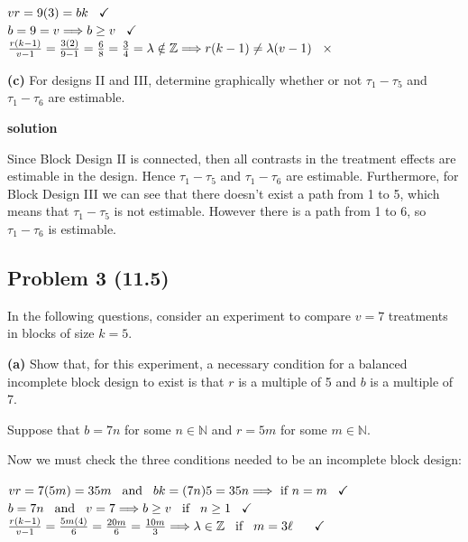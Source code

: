 \documentclass[12pt,]{article}
\begin{document}
\begin{center}
$vr = 9(3) = bk \hspace{.3cm}  \checkmark$\\
$b= 9 = v \Longrightarrow b \geq v \hspace{.3cm}  \checkmark$\\
$\frac{r(k-1)}{v-1} = \frac{3(2)}{9-1} = \frac{6}{8} = \frac{3}{4} = \lambda  \notin \mathbb{Z} \Longrightarrow r(k-1) \neq \lambda (v-1)  \hspace{.3cm} \times$
\end{center}

\textbf{(c)} For designs II and III, determine graphically whether or
not \(\tau_1 - \tau_5\) and \(\tau_1 - \tau_6\) are estimable.

\textbf{solution}

Since Block Design II is connected, then all contrasts in the treatment
effects are estimable in the design. Hence \(\tau_1 - \tau_5\) and
\(\tau_1 - \tau_6\) are estimable. Furthermore, for Block Design III we
can see that there doesn't exist a path from 1 to 5, which means that
\(\tau_1 - \tau_5\) is not estimable. However there is a path from 1 to
6, so \(\tau_1 - \tau_6\) is estimable.

\subsection{Problem 3 (11.5)}\label{problem-3-11.5}

In the following questions, consider an experiment to compare \(v = 7\)
treatments in blocks of size \(k = 5\).

\textbf{(a)} Show that, for this experiment, a necessary condition for a
balanced incomplete block design to exist is that \(r\) is a multiple of
5 and \(b\) is a multiple of 7.

Suppose that \(b= 7n\) for some \(n \in \mathbb{N}\) and \(r= 5m\) for
some \(m \in \mathbb{N}\).

Now we must check the three conditions needed to be an incomplete block
design:

\begin{center}
$vr = 7(5m) = 35m  \hspace{.3cm} \text{and} \hspace{.3cm} bk = (7n)5 = 35n \Longrightarrow \text{ if } n=m \hspace{.3cm}  \checkmark$\\
$b= 7n \hspace{.3cm} \text{and} \hspace{.3cm}  v=7 \Longrightarrow b \geq v \hspace{.3cm} \text{if} \hspace{.3cm} n \geq 1 \hspace{.3cm}  \checkmark$\\
$\frac{r(k-1)}{v-1} = \frac{5m(4)}{6} = \frac{20m}{6} = \frac{10m}{3}  
 \Longrightarrow  \lambda  \in \mathbb{Z} \hspace{.3cm} \text{if} \hspace{.3cm} m = 3\ell  \hspace{.3cm} \hspace{.3cm}  \checkmark$
\end{center}
\end{document}
